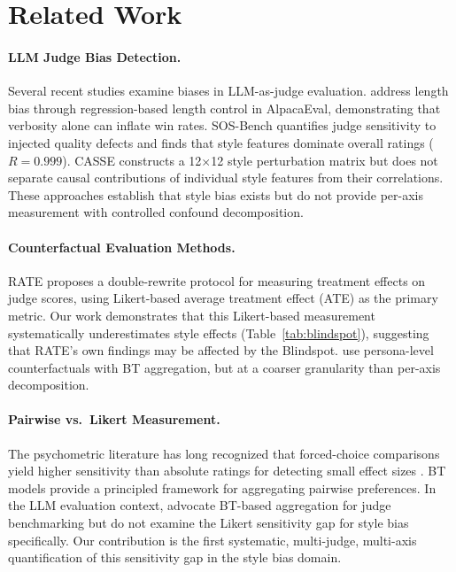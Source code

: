 \documentclass[10pt,twocolumn]{article}
\begin{document}
\section{Related Work}

\paragraph{LLM Judge Bias Detection.}
Several recent studies examine biases in LLM-as-judge evaluation.
\citet{lcalpacaeval2025} address length bias through regression-based length control in AlpacaEval, demonstrating that verbosity alone can inflate win rates.
SOS-Bench \citep{sosbench2025} quantifies judge sensitivity to injected quality defects and finds that style features dominate overall ratings ($R=0.999$).
CASSE \citep{casse2026} constructs a 12$\times$12 style perturbation matrix but does not separate causal contributions of individual style features from their correlations.
These approaches establish that style bias exists but do not provide per-axis measurement with controlled confound decomposition.

\paragraph{Counterfactual Evaluation Methods.}
RATE \citep{rate2025} proposes a double-rewrite protocol for measuring treatment effects on judge scores, using Likert-based average treatment effect (ATE) as the primary metric.
Our work demonstrates that this Likert-based measurement systematically underestimates style effects (Table~\ref{tab:blindspot}), suggesting that RATE's own findings may be affected by the Blindspot.
\citet{counterfactual_rhetorical2025} use persona-level counterfactuals with BT aggregation, but at a coarser granularity than per-axis decomposition.

\paragraph{Pairwise vs.\ Likert Measurement.}
The psychometric literature has long recognized that forced-choice comparisons yield higher sensitivity than absolute ratings for detecting small effect sizes \citep{decoster2011,stevens1946,feinstein1990}.
BT models \citep{bradleyterry1952} provide a principled framework for aggregating pairwise preferences.
In the LLM evaluation context, \citet{zeng2024} advocate BT-based aggregation for judge benchmarking but do not examine the Likert sensitivity gap for style bias specifically.
Our contribution is the first systematic, multi-judge, multi-axis quantification of this sensitivity gap in the style bias domain.
\end{document}
